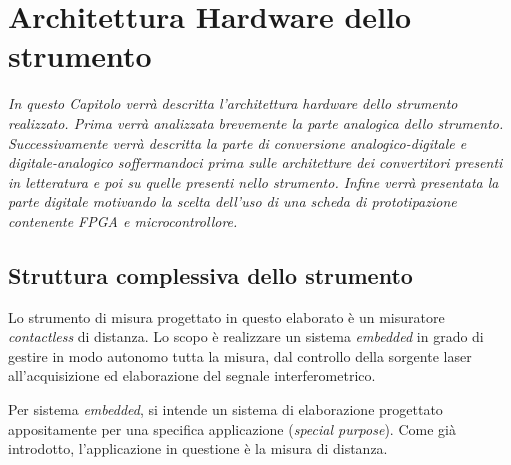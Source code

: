 \chapter{Architettura Hardware dello strumento}
\label{capitolo3}
\thispagestyle{empty}

\textit{In questo Capitolo verrà descritta l'architettura hardware dello strumento realizzato. Prima verrà analizzata brevemente la parte analogica dello strumento. Successivamente verrà descritta la parte di conversione analogico-digitale e digitale-analogico soffermandoci prima sulle architetture dei convertitori presenti in letteratura e poi su quelle presenti nello strumento. Infine verrà presentata la parte digitale motivando la scelta dell'uso di una scheda di prototipazione contenente FPGA e microcontrollore.}

\section{Struttura complessiva dello strumento}
Lo strumento di misura progettato in questo elaborato è un misuratore \textit{contactless} di distanza. Lo scopo è realizzare un sistema \textit{embedded} in grado di gestire in modo autonomo tutta la misura, dal controllo della sorgente laser all'acquisizione ed elaborazione del segnale interferometrico.

Per sistema \textit{embedded}, si intende un sistema di elaborazione progettato appositamente per una specifica applicazione (\textit{special purpose}). Come già introdotto, l'applicazione in questione è la misura di distanza. 

